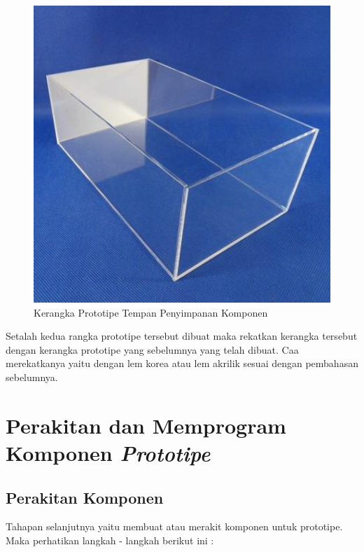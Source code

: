 \begin{enumerate}
\begin{figure}[H]
\centering
\includegraphics[width=1\textwidth]{figures/kubus2.jpg}
\caption{Kerangka Prototipe Tempan Penyimpanan Komponen }
\label{print}
\end{figure}

\par Setalah kedua rangka prototipe tersebut dibuat maka rekatkan kerangka tersebut dengan kerangka prototipe yang sebelumnya yang telah dibuat. Caa merekatkanya yaitu dengan lem korea atau lem akrilik sesuai dengan pembahasan sebelumnya.

\end{enumerate}

\section{Perakitan dan Memprogram Komponen \textit{Prototipe}}
\subsection{Perakitan Komponen}
\par Tahapan selanjutnya yaitu membuat atau merakit komponen untuk prototipe. Maka perhatikan  langkah - langkah berikut ini :

